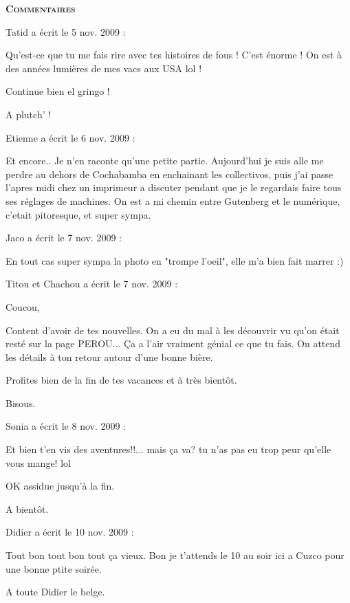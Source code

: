 \bigskip
\textbf{\textsc{Commentaires}}

\medskip
Tatid a écrit le 5 nov. 2009 :
\begin{displayquote}
Qu'est-ce que tu me fais rire avec tes histoires de fous ! C'est énorme ! On est à des années lumières de mes vacs aux USA lol !

Continue bien el gringo !

A plutch' !
\end{displayquote}

\medskip
Etienne a écrit le 6 nov. 2009 :
\begin{displayquote}
Et encore.. Je n'en raconte qu'une petite partie. Aujourd'hui je suis alle me perdre au dehors de Cochabamba en enchainant les collectivos, puis j'ai passe l'apres midi chez un imprimeur a discuter pendant que je le regardais faire tous ses réglages de machines. On est a mi chemin entre Gutenberg et le numérique, c'etait pitoresque, et super sympa.
\end{displayquote}

\medskip
Jaco a écrit le 7 nov. 2009 :
\begin{displayquote}
En tout cas super sympa la photo en "trompe l'oeil", elle m'a bien fait marrer :)
\end{displayquote}

\medskip
Titou et Chachou a écrit le 7 nov. 2009 :
\begin{displayquote}
Coucou,

Content d'avoir de tes nouvelles. On a eu du mal à les découvrir vu qu'on était resté sur la page PEROU... Ça a l'air vraiment génial ce que tu fais. On attend les détails à ton retour autour d'une bonne bière.

Profites bien de la fin de tes vacances et à très bientôt.

Bisous.
\end{displayquote}

\medskip
Sonia a écrit le 8 nov. 2009 :
\begin{displayquote}
Et bien t'en vis des aventures!!... mais ça va? tu n'as pas eu trop peur qu'elle vous mange! lol

OK assidue jusqu'à la fin.

A bientôt.
\end{displayquote}

\medskip
Didier a écrit le 10 nov. 2009 :
\begin{displayquote}
Tout bon tout bon tout ça vieux. Bon je t'attends le 10 au soir ici a Cuzco pour une bonne ptite soirée.

A toute
Didier le belge.
\end{displayquote}

